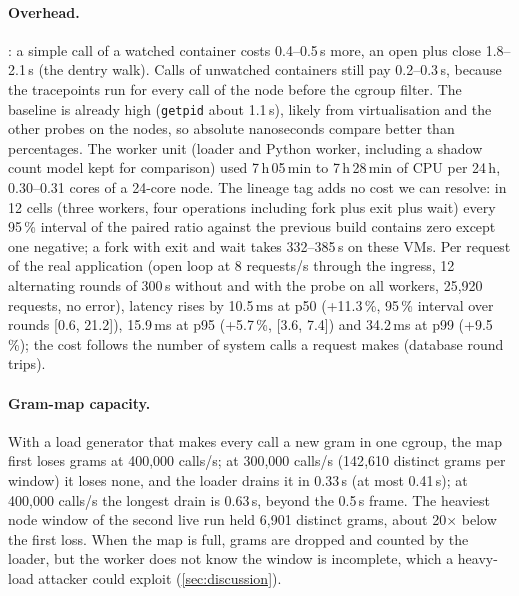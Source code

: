 \paragraph{Overhead.} : a simple call of a watched container costs 0.4--0.5\,\textmu s more, an
open plus close 1.8--2.1\,\textmu s (the dentry walk). Calls of unwatched containers still pay 0.2--0.3\,\textmu s,
because the tracepoints run for every call of the node before the cgroup filter. The baseline is already high
(\texttt{getpid} about 1.1\,\textmu s), likely from virtualisation and the other probes on the nodes, so absolute
nanoseconds compare better than percentages. The worker unit (loader and Python worker, including a shadow count model
kept for comparison) used 7\,h\,05\,min to 7\,h\,28\,min of CPU per 24\,h, 0.30--0.31 cores of a 24-core node. The
lineage tag adds no cost we can resolve: in 12 cells (three workers, four operations including fork plus exit plus
wait) every 95\,\% interval of the paired ratio against the previous build contains zero except one negative; a fork
with exit and wait takes 332--385\,\textmu s on these VMs. Per request of the real application (open loop at 8 requests/s through the ingress, 12 alternating rounds of 300\,s
without and with the probe on all workers, 25{,}920 requests, no error), latency rises by 10.5\,ms at p50 (+11.3\,\%,
95\,\% interval over rounds [0.6, 21.2]), 15.9\,ms at p95 (+5.7\,\%, [3.6, 7.4]) and 34.2\,ms at p99 (+9.5\,\%); the
cost follows the number of system calls a request makes (database round trips).

\paragraph{Gram-map capacity.} With a load generator that makes every call a new gram in one cgroup, the map first loses
grams at 400{,}000 calls/s; at 300{,}000 calls/s (142{,}610 distinct grams per window) it loses none, and the loader
drains it in 0.33\,s (at most 0.41\,s); at 400{,}000 calls/s the longest drain is 0.63\,s, beyond the 0.5\,s frame.
The heaviest node window of the second live run held 6{,}901 distinct grams, about 20$\times$ below the first loss.
When the map is full, grams are dropped and counted by the loader, but the worker does not know the window is
incomplete, which a heavy-load attacker could exploit (\cref{sec:discussion}).

